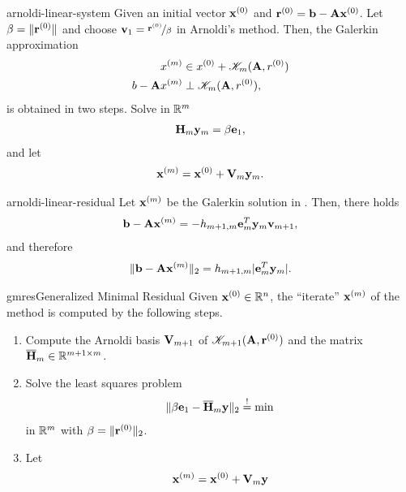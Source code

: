 \begin{Theorem}{arnoldi-linear-system}
  Given an initial vector $\mathbf x^{(0)}$ and
  $\mathbf r^{(0)} = \mathbf b - \mathbf A \mathbf x^{(0)}$. Let $\beta=\lVert\mathbf r^{(0)}\rVert$
  and choose $\mathbf v_1 =\nicefrac{\mathbf r^{(0)}}{\beta}$ in Arnoldi's
  method. Then, the Galerkin approximation
  \begin{align}
    x^{(m)} &\in x^{(0)} + \mathscr K_m(\mathbf A,r^{(0)})\\
    b-\mathbf A x^{(m)} &\perp \mathscr K_m(\mathbf A,r^{(0)}),
  \end{align}
  is obtained in two steps. Solve in $\mathbb R^m$
  \begin{gather}
    \mathbf H_m\mathbf y_m = \beta\mathbf e_1,
  \end{gather}
  and let
  \begin{gather}
    \mathbf x^{(m)} = \mathbf x^{(0)} + \mathbf V_m \mathbf y_m.
  \end{gather}
\end{Theorem}

\begin{Theorem}{arnoldi-linear-residual}
  Let $\mathbf x^{(m)}$ be the Galerkin solution in
  . Then, there holds
  \begin{gather}
    \mathbf b-\mathbf A\mathbf x^{(m)} = -h_{m+1,m} \mathbf e_m^T \mathbf y_m \mathbf v_{m+1},
  \end{gather}
  and therefore
  \begin{gather}
    \lVert\mathbf b-\mathbf A\mathbf x^{(m)}\rVert_2 = h_{m+1,m} \lvert\mathbf e_m^T \mathbf y_m\rvert.
  \end{gather}  
\end{Theorem}


\begin{Algorithm*}{gmres}{Generalized Minimal Residual}
  Given $\mathbf x^{(0)}\in\mathbb R^n$, the ``iterate'' $\mathbf x^{(m)}$ of the
   method is computed by the following steps.
  \begin{enumerate}
  \item Compute the Arnoldi basis $\mathbf V_{m+1}$ of
    $\mathscr K_{m+1}(\mathbf A,\mathbf r^{(0)})$ and the matrix $\overline{\mathbf H}_m\in\mathbb R^{m+1\times m}$.
  \item Solve the least squares problem
    \begin{gather}
      \lVert\beta\mathbf e_1 - \overline{\mathbf H}_m \mathbf y\rVert_2 \stackrel{!}{=} \min
    \end{gather}
    in $\mathbb R^m$ with $\beta = \lVert\mathbf r^{(0)}\rVert_2$.
  \item Let
    \begin{gather}
      \mathbf x^{(m)} = \mathbf x^{(0)} + \mathbf V_{m}\mathbf y
    \end{gather}
  \end{enumerate}
\end{Algorithm*}

